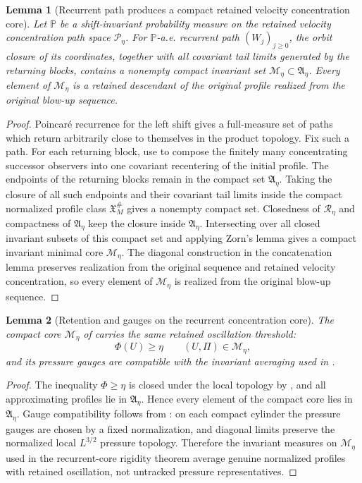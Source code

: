\documentclass[11pt]{amsart}
\numberwithin{equation}{section}
\theoremstyle{plain}
\newtheorem{lemma}[lemma]{Lemma}
\theoremstyle{definition}
\theoremstyle{remark}
\newcommand{\calM}{\mathcal M}
\begin{document}
\begin{lemma}[Recurrent path produces a compact retained velocity concentration core]
\label{lem:recurrent-path-compact-core}
Let \(\mathbb P\) be a shift-invariant probability measure on the retained velocity concentration path
space \(\mathscr P_\eta\).  For \(\mathbb P\)-a.e. recurrent path
\((W_j)_{j\ge0}\), the orbit closure of its coordinates, together with all
covariant tail limits generated by the returning blocks, contains a nonempty
compact invariant set \(\calM_\eta\subset\mathfrak A_\eta\).  Every element of
\(\calM_\eta\) is a retained descendant of the original profile realized from
the original blow-up sequence.
\end{lemma}

\begin{proof}
Poincar\'e recurrence for the left shift gives a full-measure set of paths which
return arbitrarily close to themselves in the product topology.  Fix such a
path.  For each returning block, use
 to compose the finitely many concentrating
successor observers into one covariant recentering of the initial profile.  The
endpoints of the returning blocks remain in the compact set
\(\mathfrak A_\eta\).  Taking the closure of all such endpoints and their
covariant tail limits inside the compact normalized profile class
\(\mathfrak X_M^\#\) gives a nonempty compact set.  Closedness of
\(\mathcal R_\eta\) and compactness of \(\mathfrak A_\eta\) keep the closure
inside \(\mathfrak A_\eta\).  Intersecting over all closed invariant subsets of
this compact set and applying Zorn's lemma gives a compact invariant
minimal core \(\calM_\eta\).  The diagonal construction in the concatenation
lemma preserves realization from the original sequence and retained velocity concentration,
so every element of \(\calM_\eta\) is realized from the original blow-up sequence.
\end{proof}

\begin{lemma}[Retention and gauges on the recurrent concentration core]
\label{lem:active-core-retention-gauges}
The compact core \(\calM_\eta\) of
 carries the same retained oscillation
threshold:
\[
   \Phi(U)\ge\eta\qquad (U,\Pi)\in\calM_\eta,
\]
and its pressure gauges are compatible with the invariant averaging used in
.
\end{lemma}

\begin{proof}
The inequality \(\Phi\ge\eta\) is closed under the local topology by
, and all approximating profiles lie in
\(\mathfrak A_\eta\).  Hence every element of the compact core lies in
\(\mathfrak A_\eta\).  Gauge compatibility follows from
: on each compact cylinder the pressure gauges are
chosen by a fixed normalization, and diagonal limits preserve the normalized
local \(L^{3/2}\) pressure topology.  Therefore the invariant measures on
\(\calM_\eta\) used in the recurrent-core rigidity theorem average genuine
normalized profiles with retained oscillation, not untracked pressure representatives.
\end{proof}
\end{document}
